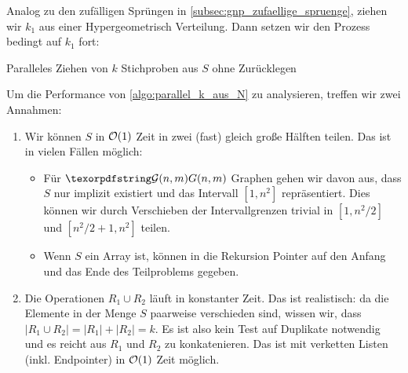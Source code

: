 Analog zu den zufälligen Sprüngen in \cref{subsec:gnp_zufaellige_spruenge}, ziehen wir $k_1$ aus einer Hypergeometrisch Verteilung.
Dann setzen wir den Prozess bedingt auf $k_1$ fort:

\begin{algorithm}
    \caption{Paralleles Ziehen von $k$ Stichproben aus $S$ ohne Zurücklegen}
    \label{algo:parallel_k_aus_N}
\end{algorithm}

\goodbreak

\noindent
Um die Performance von \cref{algo:parallel_k_aus_N} zu analysieren, treffen wir zwei Annahmen:
\begin{enumerate}
    \item Wir können $S$ in $\mathcal{O}\!\left(1\right)$ Zeit in zwei (fast) gleich große Hälften teilen.
          Das ist in vielen Fällen möglich:
          \begin{itemize}
              \item Für $\Gnm$ Graphen gehen wir davon aus, dass $S$ nur implizit existiert und das Intervall $[1, n^2]$ repräsentiert.
                    Dies können wir durch Verschieben der Intervallgrenzen trivial in $[1, n^2 / 2]$ und $[n^2/2 + 1, n^2]$ teilen.
              \item Wenn $S$ ein Array ist, können in die Rekursion Pointer auf den Anfang und das Ende des Teilproblems gegeben.
          \end{itemize}

    \item Die Operationen $R_1 \cup R_2$ läuft in konstanter Zeit.
          Das ist realistisch: da die Elemente in der Menge $S$ paarweise verschieden sind, wissen wir, dass $|R_1 \cup R_2| = |R_1| + |R_2| = k$.
          Es ist also kein Test auf Duplikate \oA notwendig und es reicht aus $R_1$ und $R_2$ zu konkatenieren.
          Das ist mit verketten Listen (inkl. Endpointer) in $\mathcal{O}\!\left(1\right)$ Zeit möglich.
\end{enumerate}

